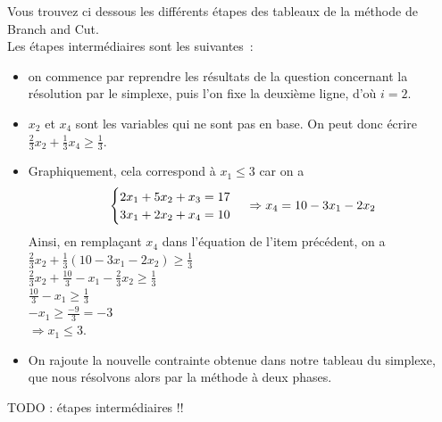 Vous trouvez ci dessous les différents étapes des tableaux de la
méthode de Branch and Cut. \\
Les étapes intermédiaires sont les suivantes~:
\begin{itemize}
\item on commence par reprendre les résultats de la question
  concernant la résolution par le simplexe, puis l'on fixe la deuxième
  ligne, d'où $i = 2$.
\item $x_2$ et $x_4$ sont les variables qui ne sont pas en base. On
  peut donc écrire $\frac{2}{3} x_2 + \frac{1}{3} x_4 \geq
  \frac{1}{3}$.
\item Graphiquement, cela correspond à $x_1 \leq 3$ car on a 
\begin{equation}
\begin{cases}
2x_1 + 5x_2 + x_3  = 17 \\
3x_1 + 2x_2 + x_4  = 10 \\
\end{cases}
\\
\Rightarrow x_4  = 10 - 3x_1 - 2x_2 
\end{equation}
Ainsi, en remplaçant $x_4$ dans l'équation de l'item précédent, on a
\\
$\frac{2}{3}x_2 + \frac{1}{3}(10-3x_1-2x_2) \geq \frac{1}{3}$ \\
$\frac{2}{3}x_2 + \frac{10}{3} - x_1 - \frac{2}{3}x_2 \geq
\frac{1}{3}$ \\
$\frac{10}{3} - x_1 \geq \frac{1}{3}$ \\
$-x_1 \geq \frac{-9}{3} = -3$ \\
$\Rightarrow x_1 \leq 3$.
\item On rajoute la nouvelle contrainte obtenue dans notre tableau du
  simplexe, que nous résolvons alors par la méthode à deux phases.
\end{itemize}

TODO : étapes intermédiaires !!

